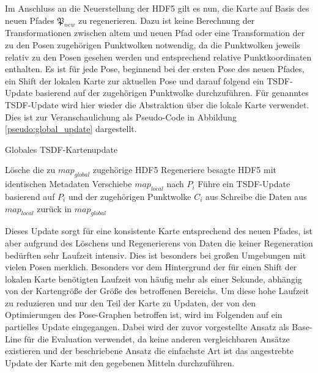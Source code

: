 Im Anschluss an die Neuerstellung der HDF5 gilt es nun, die Karte auf Basis des neuen Pfades $\mathfrak{P}_{new}$ zu regenerieren. Dazu ist keine Berechnung der Transformationen zwischen altem und neuen Pfad oder eine Transformation der zu den Posen zugehörigen Punktwolken notwendig, da die Punktwolken jeweils relativ zu den Posen gesehen werden und entsprechend relative Punktkoordinaten enthalten. Es ist für jede Pose, beginnend bei der ersten Pose des neuen Pfades, ein Shift der lokalen Karte zur aktuellen Pose und darauf folgend ein TSDF-Update basierend auf der zugehörigen Punktwolke durchzuführen. Für genanntes TSDF-Update wird hier wieder die Abstraktion über die lokale Karte verwendet. Dies ist zur Veranschaulichung als Pseudo-Code in Abbildung \ref{pseudo:global_update} dargestellt.

\begin{algorithm}[H]
\caption{Globales TSDF-Kartenupdate} \label{pseudo:global_update}
\begin{algorithmic}[1]
	\State Lösche die zu $map_{global}$ zugehörige HDF5
	\State Regeneriere besagte HDF5 mit identischen Metadaten
		\State Verschiebe $map_{local}$ nach $P_i$
		\State Führe ein TSDF-Update basierend auf $P_i$ und der zugehörigen Punktwolke $C_i$ aus
		\State Schreibe die Daten aus $map_{local}$ zurück in $map_{global}$
	\EndFor
\EndProcedure
\end{algorithmic}
\end{algorithm}

Dieses Update sorgt für eine konsistente Karte entsprechend des neuen Pfades, ist aber aufgrund des Löschens und Regenerierens von Daten die keiner Regeneration bedürften sehr Laufzeit intensiv. Dies ist besonders bei großen Umgebungen mit vielen Posen merklich. Besonders vor dem Hintergrund der für einen Shift der lokalen Karte benötigten Laufzeit von häufig mehr als einer Sekunde, abhängig von der Kartengröße der Größe des betroffenen Bereichs. Um diese hohe Laufzeit zu reduzieren und nur den Teil der Karte zu Updaten, der von den Optimierungen des Pose-Graphen betroffen ist, wird im Folgenden auf ein partielles Update eingegangen. Dabei wird der zuvor vorgestellte Ansatz als Base-Line für die Evaluation verwendet, da keine anderen vergleichbaren Ansätze existieren und der beschriebene Ansatz die einfachste Art ist das angestrebte Update der Karte mit den gegebenen Mitteln durchzuführen.


